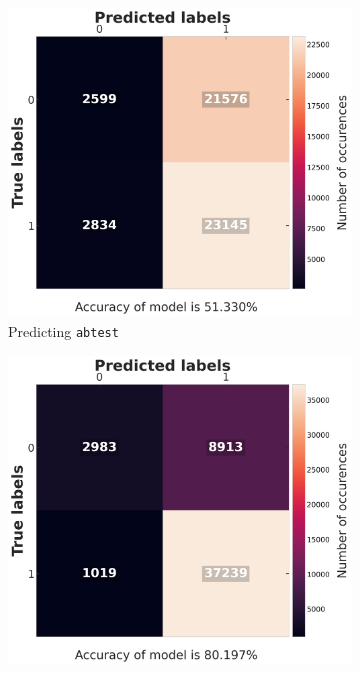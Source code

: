 \begin{figure}[h]
	\begin{center}
		\begin{subfigure}{0.32\textwidth}
			\includegraphics[width=0.99\linewidth]{./images/fig_12_ridge_abtest.png} 
			\caption{Predicting \texttt{abtest}}
		\end{subfigure}
		\begin{subfigure}{0.32\textwidth}
			\includegraphics[width=0.99\linewidth]{./images/fig_13_ridge_gearbox.png} 

\end{subfigure}
\end{center}
\end{figure}
